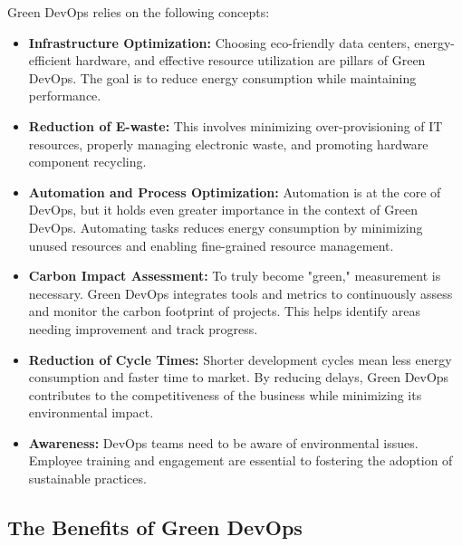 Green DevOps relies on the following concepts:
\begin{itemize}
  \item \textbf{Infrastructure Optimization:} Choosing eco-friendly data centers, energy-efficient hardware, and effective resource utilization are pillars of Green DevOps. The goal is to reduce energy consumption while maintaining performance.
  
  \item \textbf{Reduction of E-waste:} This involves minimizing over-provisioning of IT resources, properly managing electronic waste, and promoting hardware component recycling.
  
  \item \textbf{Automation and Process Optimization:} Automation is at the core of DevOps, but it holds even greater importance in the context of Green DevOps. Automating tasks reduces energy consumption by minimizing unused resources and enabling fine-grained resource management.
  
  \item \textbf{Carbon Impact Assessment:} To truly become "green," measurement is necessary. Green DevOps integrates tools and metrics to continuously assess and monitor the carbon footprint of projects. This helps identify areas needing improvement and track progress.
  
  \item \textbf{Reduction of Cycle Times:} Shorter development cycles mean less energy consumption and faster time to market. By reducing delays, Green DevOps contributes to the competitiveness of the business while minimizing its environmental impact.
  
  \item \textbf{Awareness:} DevOps teams need to be aware of environmental issues. Employee training and engagement are essential to fostering the adoption of sustainable practices.
\end{itemize}

\subsection{The Benefits of Green DevOps}


